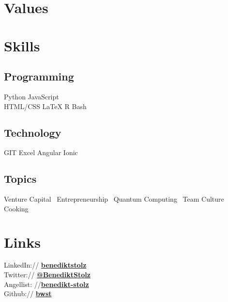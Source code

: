 \documentclass[]{deedy-resume-openfont}
\begin{document}
\begin{minipage}[t]{0.33\textwidth}
\section{Values}
\sectionsep

\section{Skills}
\subsection{Programming}
Python \textbullet{}
JavaScript \\
HTML/CSS \textbullet{}
LaTeX \textbullet{}
R \textbullet{}
Bash \textbullet{}
\sectionsep

\subsection{Technology}
GIT \textbullet{}
Excel \textbullet{}
Angular \textbullet{}
Ionic \textbullet{}
\sectionsep

\subsection{Topics}
Venture Capital~\textbullet{}
Entrepreneurship~\textbullet{}
Quantum Computing~\textbullet{}
Team Culture~\textbullet{}
Cooking~\textbullet{}
\sectionsep


\section{Links} 
LinkedIn:// \href{https://www.linkedin.com/in/benediktstolz}{\bf benediktstolz} \\
Twitter:// \href{https://twitter.com/BenediktStolz}{\bf @BenediktStolz} \\
Angellist: //\href{https://angel.co/u/benedikt-stolz}{\bf benedikt-stolz}\\
Github:// \href{https://github.com/bwst}{\bf bwst} \\
\sectionsep

%
%

\end{minipage} 
\end{document}
